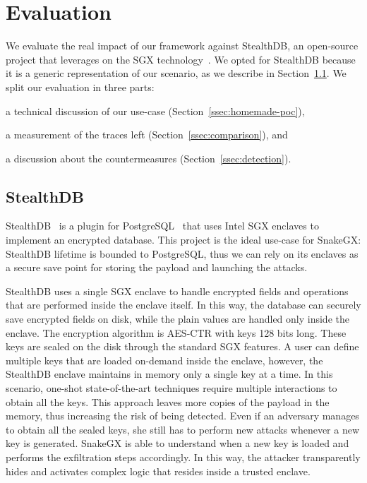 \section{Evaluation}
\label{sec:evaluation_snakegx}

We evaluate the real impact of our framework against StealthDB,
an open-source project that leverages on the SGX technology~\citep{stealthdb}.
We opted for StealthDB because it is a generic representation of our scenario, 
as we describe in Section~\ref{ssec:stealthdb}.
We split our evaluation in three parts:
\begin{enumerate*}[label=(\roman*)]
	\item a technical discussion of our use-case 
	(Section~\ref{ssec:homemade-poc}),
	\item a measurement of the traces left (Section~\ref{ssec:comparison}), and
	\item a discussion about the countermeasures (Section~\ref{ssec:detection}).
\end{enumerate*}

\subsection{StealthDB}
\label{ssec:stealthdb}
StealthDB~\citep{stealthdb} is a plugin for PostgreSQL~\citep{postgresql} that
uses Intel SGX enclaves to implement an encrypted database.
This project is the ideal use-case for SnakeGX: StealthDB lifetime is bounded 
to PostgreSQL, thus we can rely on its enclaves as a secure save point for 
storing the payload and launching the attacks.

StealthDB uses a single SGX enclave to handle encrypted fields and operations 
that are performed inside the enclave itself.
In this way, the database can securely save encrypted fields on disk, while the
plain values are handled only inside the enclave.
The encryption algorithm is AES-CTR with keys 128 bits long. These keys are 
sealed on 
the disk through the standard SGX features.
A user can define multiple keys that are loaded on-demand inside 
the enclave, however, the StealthDB enclave maintains in memory only a single 
key at a time.
In this scenario, one-shot state-of-the-art techniques 
require multiple interactions to obtain all the keys. 
This approach leaves more copies of the payload in the memory, thus increasing
the risk of being detected.
Even if an adversary manages to obtain all the sealed keys, she still has 
to perform new attacks whenever a new key is generated.
SnakeGX is able to understand when a new key is loaded and performs the 
exfiltration steps accordingly. In this way, the attacker transparently hides 
and activates complex logic that resides inside a trusted enclave. 


